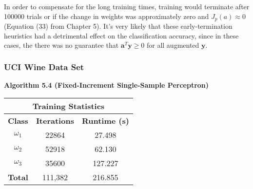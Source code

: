 \documentclass{article}
\newcommand{\mbf}[1]{\ensuremath{\mathbf{#1}}}
\newcommand{\result}[1]{\subsubsection*{#1}}
\newcommand{\fakesection}[1]{{\bf #1}\par}
\begin{document}
In order to compensate for the long training times, training would terminate after 100000 trials or if the change in weights was approximately zero and $J_p(a) \approx 0$ (Equation (33) from Chapter 5). It's very likely that these early-termination heuristics had a detrimental effect on the classification accuracy, since in these cases, the there was no guarantee that $\mbf{a}^T\mbf{y} \geq 0$ for all augmented $\mbf{y}$.

\result{UCI Wine Data Set}
\fakesection{Algorithm 5.4 (Fixed-Increment Single-Sample Perceptron)}
\begin{center}
\begin{tabular}{|c|c|c|}
\hline\multicolumn{3}{|c|}{{\bf Training Statistics}}\\
\hline{\bf Class} & {\bf Iterations} & {\bf Runtime (s)}\\\hline
$\omega_1$ & 22864 & 27.498 \\
$\omega_2$ & 52918 & 62.130 \\
$\omega_3$ & 35600 & 127.227\\
\hline
{\bf Total} & 111,382 & 216.855\\
\hline
\end{tabular}
\end{center}
\end{document}

